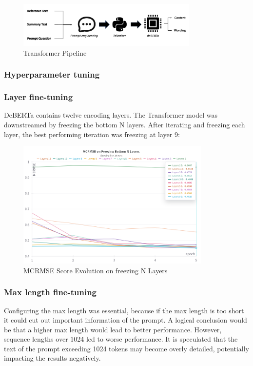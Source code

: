 \begin{figure}[H]
\begin{center}
\includegraphics[keepaspectratio, width=0.8\textwidth]{img/transformer_architecture.png}
\caption{Transformer Pipeline}
\label{fig:transformer_architecture}
\end{center}
\end{figure}
\subsubsection{Hyperparameter tuning}
\subsubsection*{Layer fine-tuning}
DeBERTa contains twelve encoding layers. The Transformer model was downstreamed by freezing the bottom N layers.
After iterating and freezing each layer, the best performing iteration was freezing at layer 9:

\begin{figure}[H]
\begin{center}
\includegraphics[keepaspectratio, width=0.86\textwidth]{img/n_layers.png}
\caption{MCRMSE Score Evolution on freezing N Layers}
\label{fig:n_layers}
\end{center}
\end{figure}
\subsubsection*{Max length fine-tuning}
Configuring the max length was essential, because if the max length is too short it could cut out important information of the prompt.
A logical conclusion would be that a higher max length would lead to better performance. However, sequence lengths over 1024 led to worse performance.
It is speculated that the text of the prompt exceeding 1024 \glspl{token} may become overly detailed, potentially impacting the results negatively.

